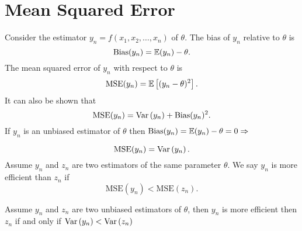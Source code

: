 \documentclass{report}
\begin{document}
\section{Mean Squared Error}

Consider the estimator $y_n = f(x_1,x_2,\dots,x_n)$ of $\theta$. The bias of $y_n$ relative to $\theta$ is
\[
	\mathrm{Bias}(y_n)=\mathbb{E}(y_n)-\theta
	.\]
The mean squared error of $y_n$ with respect to $\theta$ is
\[
	\mathrm{MSE}(y_n)=\mathbb{E}\left[(y_n-\theta)^2\right]
	.\]
It can also be shown that
\[
	\mathrm{MSE}(y_n)=\mathrm{Var}\left( y_n \right) + \mathrm{Bias}(y_n)^2
	.\]
If $y_n$ is an unbiased estimator of $\theta$ then $\mathrm{Bias}(y_n)=\mathbb{E}(y_n)-\theta=0\Rightarrow$

\[
	\mathrm{MSE}(y_n)=\mathrm{Var}\left( y_n \right)
	.\]
Assume $y_n$ and $z_n$ are two estimators of the same parameter $\theta$. We say $y_n$ is more efficient than $z_n$ if
\[
	\mathrm{MSE}(y_n)<\mathrm{MSE}(z_n)
	.\]

Assume $y_n$ and $z_n$ are two unbiased estimators of $\theta$, then $y_n$ is more efficient then $z_n$ if and only if $\mathrm{Var}\left( y_n \right)<\mathrm{Var}\left( z_n \right)$
\end{document}
